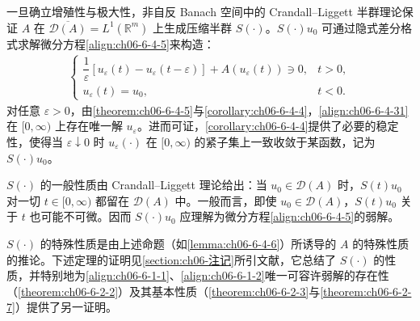 \documentclass[../../main.tex]{subfiles}
\begin{document}
一旦确立增殖性与极大性，非自反 Banach 空间中的 Crandall--Liggett 半群理论保证 $A$ 在 $\overline{\mathscr{D}(A)}=L^{1}(\mathbb{R}^{m})$ 上生成压缩半群 $S(\cdot)$。$S(\cdot)u_{0}$ 可通过隐式差分格式求解微分方程\eqref{align:ch06-6-4-5}来构造：
\begin{align}
\begin{cases}
\dfrac{1}{\varepsilon}[u_{\varepsilon}(t)-u_{\varepsilon}(t-\varepsilon)]+A(u_{\varepsilon}(t))\ni 0, & t>0,\\[6pt]
u_{\varepsilon}(t)=u_{0}, & t<0.
\end{cases}
\label{align:ch06-6-4-31}
\end{align}
对任意 $\varepsilon>0$，由\cref{theorem:ch06-6-4-5}与\cref{corollary:ch06-6-4-4}，\eqref{align:ch06-6-4-31}在 $[0,\infty)$ 上存在唯一解 $u_{\varepsilon}$。进而可证，\cref{corollary:ch06-6-4-4}提供了必要的稳定性，使得当 $\varepsilon\downarrow 0$ 时 $u_{\varepsilon}(\cdot)$ 在 $[0,\infty)$ 的紧子集上一致收敛于某函数，记为 $S(\cdot)u_{0}$。

$S(\cdot)$ 的一般性质由 Crandall--Liggett 理论给出：当 $u_{0}\in\mathscr{D}(A)$ 时，$S(t)u_{0}$ 对一切 $t\in[0,\infty)$ 都留在 $\mathscr{D}(A)$ 中。一般而言，即使 $u_{0}\in\mathscr{D}(A)$，$S(t)u_{0}$ 关于 $t$ 也可能不可微。因而 $S(\cdot)u_{0}$ 应理解为微分方程\eqref{align:ch06-6-4-5}的弱解。

$S(\cdot)$ 的特殊性质是由上述命题（如\cref{lemma:ch06-6-4-6}）所诱导的 $A$ 的特殊性质的推论。下述定理的证明见\cref{section:ch06-注记}所引文献，它总结了 $S(\cdot)$ 的性质，并特别地为\eqref{align:ch06-6-1-1}、\eqref{align:ch06-6-1-2}唯一可容许弱解的存在性（\cref{theorem:ch06-6-2-2}）及其基本性质（\cref{theorem:ch06-6-2-3}与\cref{theorem:ch06-6-2-7}）提供了另一证明。
\end{document}
